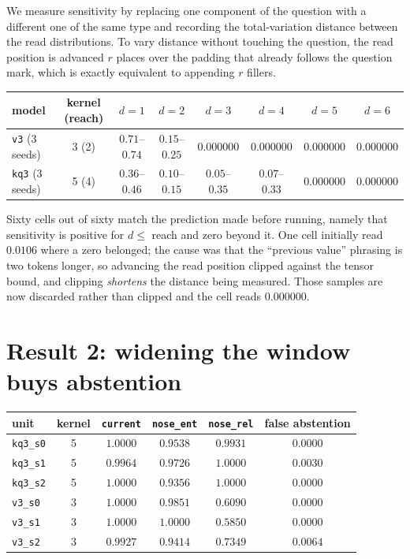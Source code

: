 \documentclass[11pt,a4paper]{article}
\begin{document}
We measure sensitivity by replacing one component of the question with a different one of the same
type and recording the total-variation distance between the read distributions. To vary distance
without touching the question, the read position is advanced $r$ places over the padding that already
follows the question mark, which is exactly equivalent to appending $r$ fillers.

\begin{center}
\begin{tabular}{lccccccc}
\toprule
model & kernel (reach) & $d{=}1$ & $d{=}2$ & $d{=}3$ & $d{=}4$ & $d{=}5$ & $d{=}6$ \\
\midrule
\texttt{v3} (3 seeds) & 3 (2) & $0.71$--$0.74$ & $0.15$--$0.25$ & $\mathbf{0.000000}$ & $\mathbf{0.000000}$ & $\mathbf{0.000000}$ & $\mathbf{0.000000}$ \\
\texttt{kq3} (3 seeds) & 5 (4) & $0.36$--$0.46$ & $0.10$--$0.15$ & $0.05$--$0.35$ & $0.07$--$0.33$ & $\mathbf{0.000000}$ & $\mathbf{0.000000}$ \\
\bottomrule
\end{tabular}
\end{center}

Sixty cells out of sixty match the prediction made before running, namely that sensitivity is positive
for $d \le$ reach and zero beyond it. One cell initially read $0.0106$ where a zero belonged; the cause
was that the ``previous value'' phrasing is two tokens longer, so advancing the read position clipped
against the tensor bound, and clipping \emph{shortens} the distance being measured. Those samples are
now discarded rather than clipped and the cell reads $0.000000$.

\section{Result 2: widening the window buys abstention}

\begin{center}
\begin{tabular}{lccccc}
\toprule
unit & kernel & \texttt{current} & \texttt{nose\_ent} & \textbf{\texttt{nose\_rel}} & false abstention \\
\midrule
\texttt{kq3\_s0} & 5 & $1.0000$ & $0.9538$ & $\mathbf{0.9931}$ & $0.0000$ \\
\texttt{kq3\_s1} & 5 & $0.9964$ & $0.9726$ & $\mathbf{1.0000}$ & $0.0030$ \\
\texttt{kq3\_s2} & 5 & $1.0000$ & $0.9356$ & $\mathbf{1.0000}$ & $0.0000$ \\
\midrule
\texttt{v3\_s0} & 3 & $1.0000$ & $0.9851$ & $0.6090$ & $0.0000$ \\
\texttt{v3\_s1} & 3 & $1.0000$ & $1.0000$ & $0.5850$ & $0.0000$ \\
\texttt{v3\_s2} & 3 & $0.9927$ & $0.9414$ & $0.7349$ & $0.0064$ \\
\bottomrule
\end{tabular}
\end{center}
\end{document}
